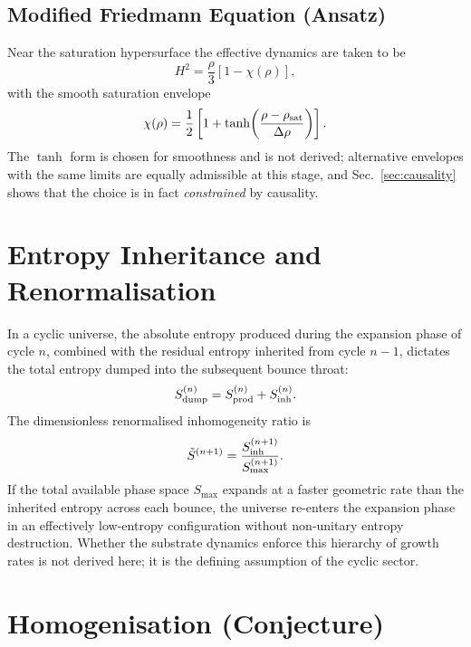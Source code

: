 \documentclass[reprint,superscriptaddress,amsmath,amssymb,aps,prd,showkeys,nofootinbib]{revtex4-2}
\begin{document}
\subsection{Modified Friedmann Equation (Ansatz)}
Near the saturation hypersurface the effective dynamics are taken to be
\begin{equation}
H^2 = \frac{\rho}{3}\left[1 - \chi(\rho)\right],
\end{equation}
with the smooth saturation envelope
\begin{equation}
\chi(\rho) = \frac{1}{2}\left[1+\tanh\!\left(\frac{\rho-\rho_{\rm sat}}{\Delta\rho}\right)\right].
\label{eq:envelope}
\end{equation}
The $\tanh$ form is chosen for smoothness and is not derived; alternative envelopes with
the same limits are equally admissible at this stage, and Sec.~\ref{sec:causality} shows
that the choice is in fact \emph{constrained} by causality.

\section{Entropy Inheritance and Renormalisation}

In a cyclic universe, the absolute entropy produced during the expansion phase of cycle $n$,
combined with the residual entropy inherited from cycle $n-1$, dictates the total entropy
dumped into the subsequent bounce throat:
\begin{equation}
S_{\rm dump}^{(n)} = S_{\rm prod}^{(n)} + S_{\rm inh}^{(n)}.
\end{equation}
The dimensionless renormalised inhomogeneity ratio is
\begin{equation}
\tilde{S}^{(n+1)} = \frac{S_{\rm inh}^{(n+1)}}{S_{\max}^{(n+1)}}.
\end{equation}
If the total available phase space $S_{\max}$ expands at a faster geometric rate than the
inherited entropy across each bounce, the universe re-enters the expansion phase in an
effectively low-entropy configuration without non-unitary entropy destruction. Whether the
substrate dynamics enforce this hierarchy of growth rates is not derived here; it is the
defining assumption of the cyclic sector.

\section{Homogenisation (Conjecture)}
\label{sec:homog}
\end{document}
